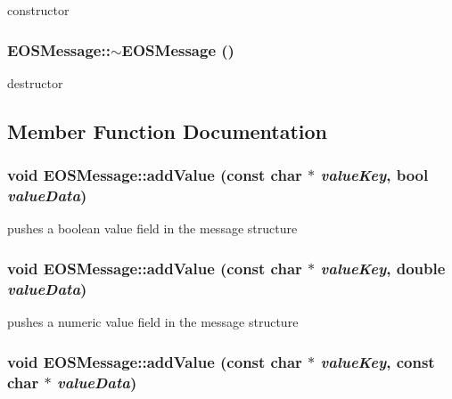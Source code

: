 constructor 

\hypertarget{classEOSMessage_57e0677a37c99625d6480d91a910a8bc}{
\subsubsection[{$\sim$EOSMessage}]{\setlength{\rightskip}{0pt plus 5cm}EOSMessage::$\sim$EOSMessage ()}}
\label{classEOSMessage_57e0677a37c99625d6480d91a910a8bc}


destructor 



\subsection{Member Function Documentation}
\hypertarget{classEOSMessage_7eea6ddaa2fc88e278f1b8916a72da94}{
\subsubsection[{addValue}]{\setlength{\rightskip}{0pt plus 5cm}void EOSMessage::addValue (const char $\ast$ {\em valueKey}, \/  bool {\em valueData})}}
\label{classEOSMessage_7eea6ddaa2fc88e278f1b8916a72da94}


pushes a boolean value field in the message structure 

\hypertarget{classEOSMessage_fa321169de1d36442816d52085a2d7c8}{
\subsubsection[{addValue}]{\setlength{\rightskip}{0pt plus 5cm}void EOSMessage::addValue (const char $\ast$ {\em valueKey}, \/  double {\em valueData})}}
\label{classEOSMessage_fa321169de1d36442816d52085a2d7c8}


pushes a numeric value field in the message structure 

\hypertarget{classEOSMessage_4e26aa7bc47fb80d6b06cbdb12b63a51}{
\subsubsection[{addValue}]{\setlength{\rightskip}{0pt plus 5cm}void EOSMessage::addValue (const char $\ast$ {\em valueKey}, \/  const char $\ast$ {\em valueData})}}
\label{classEOSMessage_4e26aa7bc47fb80d6b06cbdb12b63a51}


